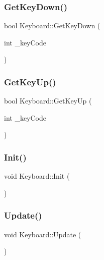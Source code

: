 \subsubsection{\texorpdfstring{Get\+Key\+Down()}{GetKeyDown()}}
{\footnotesize\ttfamily bool Keyboard\+::\+Get\+Key\+Down (\begin{DoxyParamCaption}\item[{int}]{\+\_\+key\+Code }\end{DoxyParamCaption})}

\mbox{\label{class_keyboard_a17da03653e9ea94b0175943fc317b56b}} 
\subsubsection{\texorpdfstring{Get\+Key\+Up()}{GetKeyUp()}}
{\footnotesize\ttfamily bool Keyboard\+::\+Get\+Key\+Up (\begin{DoxyParamCaption}\item[{int}]{\+\_\+key\+Code }\end{DoxyParamCaption})}

\mbox{\label{class_keyboard_aa2ee7cfb4ef44e708877653a92af6f29}} 
\subsubsection{\texorpdfstring{Init()}{Init()}}
{\footnotesize\ttfamily void Keyboard\+::\+Init (\begin{DoxyParamCaption}{ }\end{DoxyParamCaption})}

\mbox{\label{class_keyboard_a071313d0ae6538e9307ff6a059aa9197}} 
\subsubsection{\texorpdfstring{Update()}{Update()}}
{\footnotesize\ttfamily void Keyboard\+::\+Update (\begin{DoxyParamCaption}{ }\end{DoxyParamCaption})}



